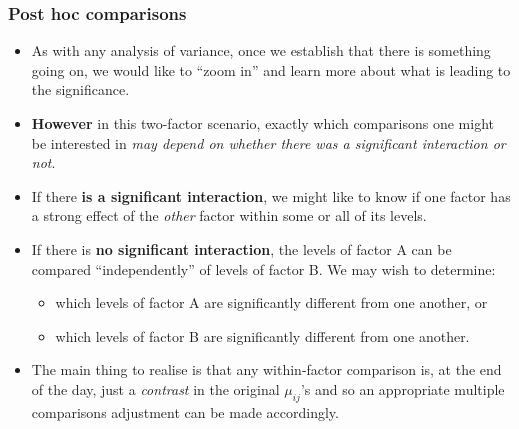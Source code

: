 \documentclass[a4paper]{article}\usepackage[]{graphicx}\usepackage[]{xcolor}
\begin{document}
\subsubsection{Post hoc comparisons}
\begin{itemize}
	\item As with any analysis of variance, once we establish that there is something going on, we would like to ``zoom in'' and learn more about what is leading to the significance.
	\item \textbf{However} in this two-factor scenario, exactly which comparisons one might be interested in \textit{may depend on whether there was a significant interaction or not}.
	\item If there \textbf{is a significant interaction}, we might like to know if one factor has a strong effect of the \textit{other} factor within some or all of its levels.
	\item If there is \textbf{no significant interaction}, the levels of factor A can be compared ``independently'' of levels of factor B. We may wish to determine:
	\begin{itemize}
		\item which levels of factor A are significantly different from one another, or
		\item which levels of factor B are significantly different from one another.
	\end{itemize}
	\item The main thing to realise is that any within-factor comparison is, at the end of the day, just a \textit{contrast} in the original \( \mu_{ij} \)'s and so an appropriate multiple comparisons adjustment can be made accordingly.
\end{itemize}
\end{document}
